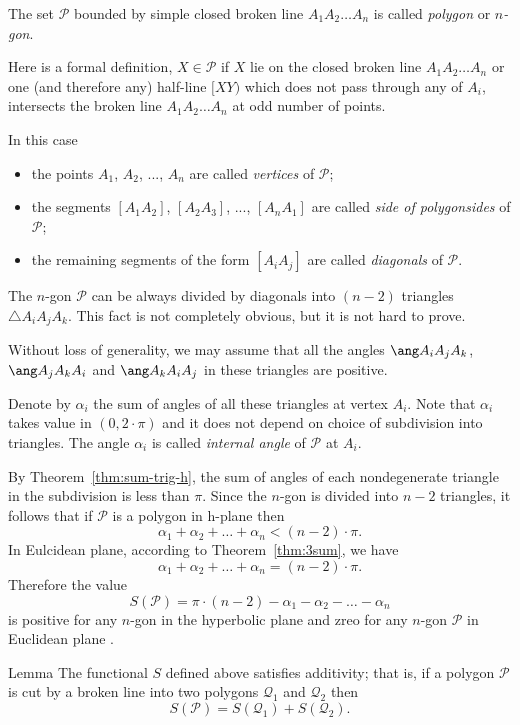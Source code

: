 The set $\mathcal{P}$ bounded by simple closed broken line $A_1A_2\dots A_n$ is called
\emph{polygon} or \emph{$n$-gon}.

Here is a formal definition, $X\in\mathcal{P}$ if $X$ lie on the closed broken line $A_1A_2\dots A_n$ or one (and therefore any) half-line $[XY)$ which does not pass through any of $A_i$, intersects the broken line $A_1A_2\dots A_n$ at odd number of points.

In this case
\begin{itemize}
\item the points $A_1$, $A_2$, ..., $A_n$ are called \emph{vertices} of $\mathcal{P}$;
\item the segments $[A_1A_2]$, $[A_2A_3]$, ..., $[A_{n}A_1]$ 
are called 
\emph{side of polygon}\emph{sides} of $\mathcal{P}$;
\item the remaining segments of the form $[A_iA_j]$ are called  
\emph{diagonals} of $\mathcal{P}$.
\end{itemize}

The  $n$-gon $\mathcal{P}$ can be always divided by diagonals into $(n-2)$ triangles $\triangle A_iA_jA_k$.
This fact is not completely obvious, but it is not hard to prove.

Without loss of generality, we may assume that all the angles $\ang A_iA_jA_k$,
$\ang A_jA_kA_i$ and $\ang A_kA_iA_j$ in these triangles are positive.

Denote by $\alpha_i$ the sum of angles of all these triangles at vertex $A_i$.
Note that $\alpha_i$ takes value in $(0,2\cdot\pi)$ and it does not depend on choice of subdivision into triangles.
The angle $\alpha_i$ is called 
\emph{internal angle} of $\mathcal{P}$ at $A_i$.

By Theorem~\ref{thm:sum-trig-h}, the sum of angles of each nondegenerate triangle in the subdivision is less than $\pi$.
Since the $n$-gon is divided into $n-2$ triangles, 
it follows that if $\mathcal{P}$ is a polygon in h-plane then
$$\alpha_1+\alpha_2+\dots+\alpha_n< (n-2)\cdot\pi.$$
In Eulcidean plane, according to Theorem~\ref{thm:3sum}, we have 
$$\alpha_1+\alpha_2+\dots+\alpha_n=(n-2)\cdot\pi.$$
Therefore the value
$$S(\mathcal{P})=\pi\cdot(n-2)-\alpha_1-\alpha_2-\dots-\alpha_n$$
is positive for any $n$-gon in the hyperbolic plane and zreo for any $n$-gon $\mathcal{P}$ in Euclidean plane .

\begin{thm}{Lemma}\label{lem:n-sum-angle}
The functional $S$ defined above satisfies additivity; 
that is, if a polygon $\mathcal{P}$ is cut by a broken line into two polygons 
$\mathcal{Q}_1$ and $\mathcal{Q}_2$ then
$$S(\mathcal{P})=
S(\mathcal{Q}_1)+S(\mathcal{Q}_2).$$

\end{thm}

